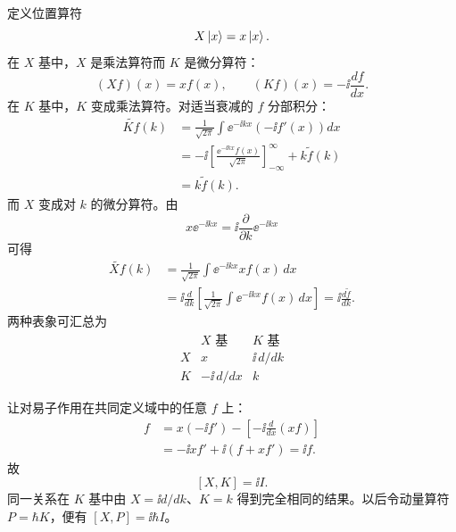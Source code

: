 定义位置算符
\begin{equation}
  X\left|x\right\rangle=x\left|x\right\rangle.
  \label{eq:QM-C01-S10-position-eigenproblem}
\end{equation}
在 $X$ 基中，$X$ 是乘法算符而 $K$ 是微分算符：
\begin{equation}
  (Xf)(x)=xf(x),
  \qquad
  (Kf)(x)=-\ii\frac{df}{dx}.
  \label{eq:QM-C01-S10-x-representation}
\end{equation}
在 $K$ 基中，$K$ 变成乘法算符。对适当衰减的 $f$ 分部积分：
\begin{align}
  \widetilde{Kf}(k)
  &=\frac1{\sqrt{2\pi}}
    \int\ee^{-\ii kx}\left(-\ii f'(x)\right)dx \\
  &=-\ii\left[
    \frac{\ee^{-\ii kx}f(x)}{\sqrt{2\pi}}
    \right]_{-\infty}^{\infty}
    +k\widetilde f(k) \\
  &=k\widetilde f(k).
  \label{eq:QM-C01-S10-k-in-k-representation}
\end{align}
而 $X$ 变成对 $k$ 的微分算符。由
\[
  x\ee^{-\ii kx}=\ii\frac{\partial}{\partial k}\ee^{-\ii kx}
\]
可得
\begin{align}
  \widetilde{Xf}(k)
  &=\frac1{\sqrt{2\pi}}
    \int\ee^{-\ii kx}x f(x)\,dx \\
  &=\ii\frac{d}{dk}
    \left[
      \frac1{\sqrt{2\pi}}
      \int\ee^{-\ii kx}f(x)\,dx
    \right]
  =\ii\frac{d\widetilde f}{dk}.
  \label{eq:QM-C01-S10-x-in-k-representation}
\end{align}
两种表象可汇总为
\begin{equation}
  \begin{array}{c|cc}
    &X\text{ 基}&K\text{ 基}\\ \hline
    X&x&\ii\,d/dk\\
    K&-\ii\,d/dx&k
  \end{array}
  \label{eq:QM-C01-S10-conjugate-representations}
\end{equation}

让对易子作用在共同定义域中的任意 $f$ 上：
\begin{align}
  [X,K]f
  &=x(-\ii f')
    -\left[-\ii\frac{d}{dx}(xf)\right] \\
  &=-\ii xf'+\ii(f+xf')=\ii f.
  \label{eq:QM-C01-S10-x-k-commutator-check}
\end{align}
故
\begin{equation}
  \boxed{[X,K]=\ii I.}
  \label{eq:QM-C01-S10-x-k-commutator}
\end{equation}
同一关系在 $K$ 基中由 $X=\ii d/dk$、$K=k$ 得到完全相同的结果。以后令动量算符 $P=\hbar K$，便有 $[X,P]=\ii\hbar I$。

